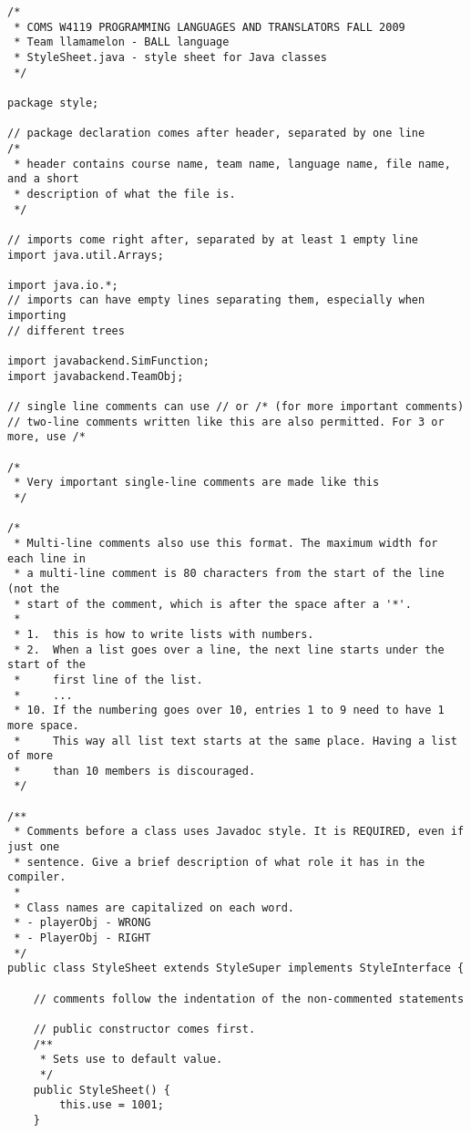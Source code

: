 \begin{singlespacing}
\begin{verbatim}
/*
 * COMS W4119 PROGRAMMING LANGUAGES AND TRANSLATORS FALL 2009
 * Team llamamelon - BALL language
 * StyleSheet.java - style sheet for Java classes
 */

package style;

// package declaration comes after header, separated by one line
/*
 * header contains course name, team name, language name, file name, and a short
 * description of what the file is.
 */

// imports come right after, separated by at least 1 empty line
import java.util.Arrays;

import java.io.*;
// imports can have empty lines separating them, especially when importing
// different trees

import javabackend.SimFunction;
import javabackend.TeamObj;

// single line comments can use // or /* (for more important comments)
// two-line comments written like this are also permitted. For 3 or more, use /*

/*
 * Very important single-line comments are made like this
 */

/*
 * Multi-line comments also use this format. The maximum width for each line in
 * a multi-line comment is 80 characters from the start of the line (not the
 * start of the comment, which is after the space after a '*'.
 * 
 * 1.  this is how to write lists with numbers.
 * 2.  When a list goes over a line, the next line starts under the start of the
 *     first line of the list.
 *     ...
 * 10. If the numbering goes over 10, entries 1 to 9 need to have 1 more space.
 *     This way all list text starts at the same place. Having a list of more 
 *     than 10 members is discouraged.
 */

/**
 * Comments before a class uses Javadoc style. It is REQUIRED, even if just one
 * sentence. Give a brief description of what role it has in the compiler. 
 * 
 * Class names are capitalized on each word. 
 * - playerObj - WRONG 
 * - PlayerObj - RIGHT
 */
public class StyleSheet extends StyleSuper implements StyleInterface {

    // comments follow the indentation of the non-commented statements
    
    // public constructor comes first.
    /**
     * Sets use to default value. 
     */
    public StyleSheet() {
        this.use = 1001;
    }


\end{verbatim}
\end{singlespacing}

